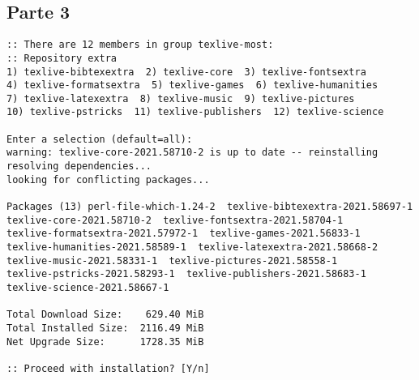 \subsection{Parte 3}

\begin{lstlisting}[style=output]
:: There are 12 members in group texlive-most:
:: Repository extra
1) texlive-bibtexextra  2) texlive-core  3) texlive-fontsextra
4) texlive-formatsextra  5) texlive-games  6) texlive-humanities
7) texlive-latexextra  8) texlive-music  9) texlive-pictures
10) texlive-pstricks  11) texlive-publishers  12) texlive-science

Enter a selection (default=all): 
warning: texlive-core-2021.58710-2 is up to date -- reinstalling
resolving dependencies...
looking for conflicting packages...

Packages (13) perl-file-which-1.24-2  texlive-bibtexextra-2021.58697-1
texlive-core-2021.58710-2  texlive-fontsextra-2021.58704-1
texlive-formatsextra-2021.57972-1  texlive-games-2021.56833-1
texlive-humanities-2021.58589-1  texlive-latexextra-2021.58668-2
texlive-music-2021.58331-1  texlive-pictures-2021.58558-1
texlive-pstricks-2021.58293-1  texlive-publishers-2021.58683-1
texlive-science-2021.58667-1

Total Download Size:    629.40 MiB
Total Installed Size:  2116.49 MiB
Net Upgrade Size:      1728.35 MiB

:: Proceed with installation? [Y/n] 
\end{lstlisting}